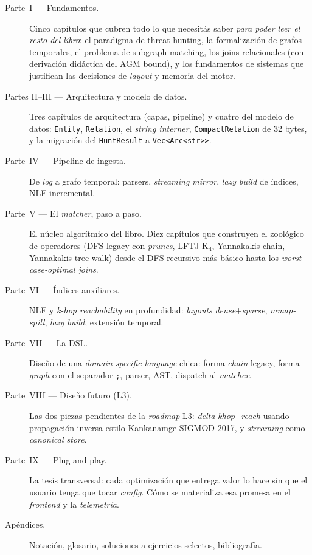 \begin{description}
    \item[Parte~I — Fundamentos.] Cinco capítulos que cubren todo lo
    que necesitás saber \emph{para poder leer el resto del libro}: el
    paradigma de threat hunting, la formalización de grafos
    temporales, el problema de subgraph matching, los joins
    relacionales (con derivación didáctica del AGM bound), y los
    fundamentos de sistemas que justifican las decisiones de
    \emph{layout} y memoria del motor.
    \item[Partes II--III — Arquitectura y modelo de datos.] Tres
    capítulos de arquitectura (capas, pipeline) y cuatro del modelo
    de datos: \texttt{Entity}, \texttt{Relation}, el \emph{string
    interner}, \texttt{CompactRelation} de 32 bytes, y la
    migración del \texttt{HuntResult} a \texttt{Vec<Arc<str>>}.
    \item[Parte~IV — Pipeline de ingesta.] De \emph{log} a grafo
    temporal: parsers, \emph{streaming mirror}, \emph{lazy build} de
    índices, NLF incremental.
    \item[Parte~V — El \emph{matcher}, paso a paso.] El núcleo
    algorítmico del libro. Diez capítulos que construyen el zoológico
    de operadores (DFS legacy con \emph{prunes}, LFTJ-K\(_4\),
    Yannakakis chain, Yannakakis tree-walk) desde el DFS recursivo
    más básico hasta los \emph{worst-case-optimal joins}.
    \item[Parte~VI — Índices auxiliares.] NLF y \emph{k-hop
    reachability} en profundidad: \emph{layouts} \emph{dense}+\emph{sparse},
    \emph{mmap-spill}, \emph{lazy build}, extensión temporal.
    \item[Parte~VII — La DSL.] Diseño de una \emph{domain-specific
    language} chica: forma \emph{chain} legacy, forma \emph{graph} con
    el separador \texttt{;}, parser, AST, dispatch al \emph{matcher}.
    \item[Parte~VIII — Diseño futuro (L3).] Las dos piezas pendientes
    de la \emph{roadmap} L3: \emph{delta} \emph{khop\_reach} usando
    propagación inversa estilo Kankanamge SIGMOD 2017, y
    \emph{streaming} como \emph{canonical store}.
    \item[Parte~IX — Plug-and-play.] La tesis transversal: cada
    optimización que entrega valor lo hace sin que el usuario tenga
    que tocar \emph{config}. Cómo se materializa esa promesa en el
    \emph{frontend} y la \emph{telemetría}.
    \item[Apéndices.] Notación, glosario, soluciones a ejercicios
    selectos, bibliografía.
\end{description}

